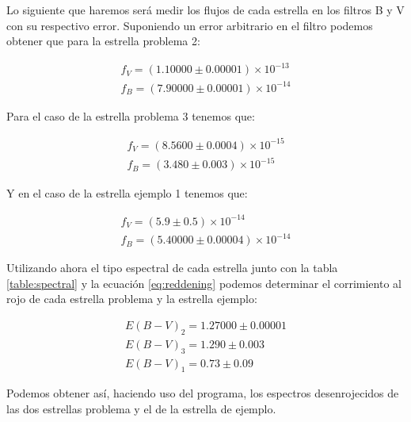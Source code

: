 \documentclass{aa} %
\begin{document}
Lo siguiente que haremos será medir los flujos de cada estrella en los filtros B y V con su respectivo error. Suponiendo un error arbitrario en el filtro podemos obtener que para la estrella problema 2:

$$
\begin{array}{c}
f_V = (1.10000 \pm 0.00001) \times 10^{-13} \\ f_B = (7.90000 \pm 0.00001) \times 10^{-14}
\end{array}
$$

Para el caso de la estrella problema 3 tenemos que:

$$
\begin{array}{c}
f_V = (8.5600 \pm 0.0004) \times 10^{-15} \\ f_B = (3.480 \pm 0.003) \times 10^{-15}
\end{array}
$$

Y en el caso de la estrella ejemplo 1 tenemos que:

$$
\begin{array}{c}
f_V = (5.9 \pm 0.5) \times 10^{-14} \\ f_B = (5.40000 \pm 0.00004) \times 10^{-14}
\end{array}
$$

Utilizando ahora el tipo espectral de cada estrella junto con la tabla \ref{table:spectral} y la ecuación \ref{eq:reddening} podemos determinar el corrimiento al rojo de cada estrella problema y la estrella ejemplo:

$$
\begin{array}{c}
E(B - V)_2 = 1.27000 \pm 0.00001 \\ E(B-V)_3 = 1.290 \pm 0.003 \\ E(B-V)_1 = 0.73 \pm 0.09
\end{array}
$$

Podemos obtener así, haciendo uso del programa, los espectros desenrojecidos de las dos estrellas problema y el de la estrella de ejemplo.
\end{document}
